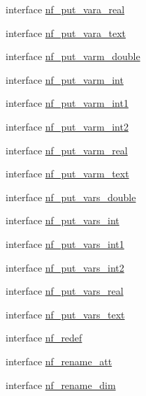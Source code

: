 \begin{DoxyCompactItemize}
\item 
interface \hyperlink{interfacenetcdf__nf__interfaces_1_1nf__put__vara__real}{nf\+\_\+put\+\_\+vara\+\_\+real}
\item 
interface \hyperlink{interfacenetcdf__nf__interfaces_1_1nf__put__vara__text}{nf\+\_\+put\+\_\+vara\+\_\+text}
\item 
interface \hyperlink{interfacenetcdf__nf__interfaces_1_1nf__put__varm__double}{nf\+\_\+put\+\_\+varm\+\_\+double}
\item 
interface \hyperlink{interfacenetcdf__nf__interfaces_1_1nf__put__varm__int}{nf\+\_\+put\+\_\+varm\+\_\+int}
\item 
interface \hyperlink{interfacenetcdf__nf__interfaces_1_1nf__put__varm__int1}{nf\+\_\+put\+\_\+varm\+\_\+int1}
\item 
interface \hyperlink{interfacenetcdf__nf__interfaces_1_1nf__put__varm__int2}{nf\+\_\+put\+\_\+varm\+\_\+int2}
\item 
interface \hyperlink{interfacenetcdf__nf__interfaces_1_1nf__put__varm__real}{nf\+\_\+put\+\_\+varm\+\_\+real}
\item 
interface \hyperlink{interfacenetcdf__nf__interfaces_1_1nf__put__varm__text}{nf\+\_\+put\+\_\+varm\+\_\+text}
\item 
interface \hyperlink{interfacenetcdf__nf__interfaces_1_1nf__put__vars__double}{nf\+\_\+put\+\_\+vars\+\_\+double}
\item 
interface \hyperlink{interfacenetcdf__nf__interfaces_1_1nf__put__vars__int}{nf\+\_\+put\+\_\+vars\+\_\+int}
\item 
interface \hyperlink{interfacenetcdf__nf__interfaces_1_1nf__put__vars__int1}{nf\+\_\+put\+\_\+vars\+\_\+int1}
\item 
interface \hyperlink{interfacenetcdf__nf__interfaces_1_1nf__put__vars__int2}{nf\+\_\+put\+\_\+vars\+\_\+int2}
\item 
interface \hyperlink{interfacenetcdf__nf__interfaces_1_1nf__put__vars__real}{nf\+\_\+put\+\_\+vars\+\_\+real}
\item 
interface \hyperlink{interfacenetcdf__nf__interfaces_1_1nf__put__vars__text}{nf\+\_\+put\+\_\+vars\+\_\+text}
\item 
interface \hyperlink{interfacenetcdf__nf__interfaces_1_1nf__redef}{nf\+\_\+redef}
\item 
interface \hyperlink{interfacenetcdf__nf__interfaces_1_1nf__rename__att}{nf\+\_\+rename\+\_\+att}
\item 
interface \hyperlink{interfacenetcdf__nf__interfaces_1_1nf__rename__dim}{nf\+\_\+rename\+\_\+dim}

\end{DoxyCompactItemize}
